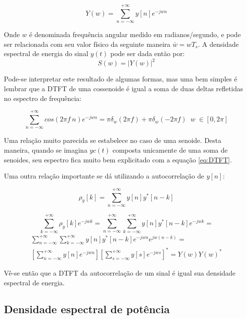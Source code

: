 \begin{equation}
Y(w)=\sum_{n=-\infty}^{+\infty}y[n]e^{-jwn}
\label{eq:DTFT}
\end{equation}

Onde $w$ é denominada frequência angular medido em radianos/segundo, e pode ser relacionada com seu valor físico da seguinte maneira $\bar{w}=wT_s$. A densidade espectral de energia do sinal $y(t)$ pode ser dada então por:
\begin{equation}
S(w)=|Y(w)|^2
\end{equation}

Pode-se interpretar este resultado de algumas formas, mas uma bem simples é lembrar que a DTFT de uma cossenoide é igual a soma de duas deltas refletidas no espectro de frequência:

\begin{equation}
\sum_{n=-\infty}^{+\infty}cos(2\pi f \: n)e^{-jwn}= \pi \delta_{w}(2\pi f) + \pi \delta_{w}(-2\pi f) \;\; w \; \in [0,2 \pi]
\end{equation}

Uma relação muito parecida se estabelece no caso de uma senoide. Desta maneira, quando se imagina $yc(t)$ composta unicamente de uma soma de senoides, seu espectro fica muito bem explicitado com a equação \ref{eq:DTFT}.

Uma outra relação importante se dá utilizando a autocorrelação de $y[n]$:

\begin{equation}
\rho_y[k]=\sum_{n=-\infty}^{+\infty}y[n]y^*[n-k]
\end{equation}

\begin{equation*}
\sum_{k=-\infty}^{+\infty}\rho_y[k]e^{-jwk}=\sum_{n=-\infty}^{+\infty}\sum_{k=-\infty}^{+\infty}y[n]y^*[n-k]e^{-jwk}=
\end{equation*}
\begin{equation}
\begin{aligned}
\sum_{n=-\infty}^{+\infty}\sum_{k=-\infty}^{+\infty}y[n]y^*[n-k]e^{-jwn}e^{jw(n-k)}  = \\ \left[\sum_{n=-\infty}^{+\infty}y[n]e^{-jwn} \right]  \left[\sum_{s=-\infty}^{+\infty}y[s]e^{-jws} \right]^* = Y(w)Y(w)^*
\end{aligned}
\end{equation}

Vê-se então que a DTFT da autocorrelação de um sinal é igual sua densidade espectral de energia.

\subsection{Densidade espectral de potência}

